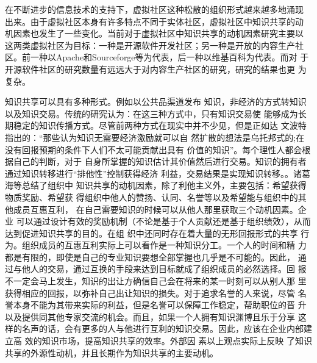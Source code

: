 \documentclass[12pt,a4paper]{ctexart}
\begin{document}
在不断进步的信息技术的支持下，虚拟社区这种松散的组织形式越来越多地涌现
出来。由于虚拟社区本身有许多特点不同于实体社区，虚拟社区中知识共享的动
机因素也发生了一些变化。当前对于虚拟社区中知识共享的动机因素研究主要以
这两类虚拟社区为目标：一种是开源软件开发社区；另一种是开放的内容生产社
区。前一种以Apache和Sourceforge等为代表，后一种以维基百科为代表。而对
于开源软件社区的研究数量有远远大于对内容生产社区的研究，研究的结果也更
为复杂。

知识共享可以具有多种形式。例如以公共品渠道发布
知识，非经济的方式转知识以及知识交易。传统的研究认为：在这三种方式中，只有知识交易使
能够成为长期稳定的知识传播方式。尽管前两种方式在现实中并不少见，但是正如达
文波特指出的：“那些认为知识无需要经济激励就可以自
然扩散的想法是乌托邦式的;在没有回报预期的条件下人们不太可能贡献出具有
价值的知识”\cite{davenport1998wko}。每个理性人都会根据自己的判断，对于
自身所掌握的知识估计其价值然后进行交易。知识的拥有者通过知识转移进行“排他性”控制获得经济
利益，交易结果是实现知识转移。\cite{zhoubo2006}。诸葛海等总结了组织中
知识共享的动机因素，除了利他主义外，主要包括：希望获得物质奖励、希望获
得组织中他人的赞扬、认同、名誉等以及希望能与组织中的其他成员互惠互利，
在自己需要知识的时候可以从他人那里获取三个动机因素\cite{Zhugea}。企业
可以通过设计有效的奖励机制（不论是基于个人贡献还是基于组织绩效），从而
达到促进知识共享的目的\cite{Lee2007}。在组
织中还同时存在着大量的无形回报形式的共享
行为。组织成员的互惠互利实际上可以看作是一种知识分工。一个人的时间和精
力都是有限的，即使是自己的专业知识要想全部掌握也几乎是不可能的。因此，
通过与他人的交易，通过互换的手段来达到目标就成了组织成员的必然选择。回
报不一定会马上发生，知识的出让方确信自己会在将来的某一时刻可以从别人那
里获得相应的回报，以弥补自己出让知识的损失。对于追求名誉的人来说，尽管
名誉本身不能为其带来实际的利益，但是名誉可以保障工作稳定，帮助职位的晋
升以及提供同其他专家交流的机会。而且，如果一个人拥有知识渊博且乐于分享
这样的名声的话，会有更多的人与他进行互利的知识交易。因此，应该在企业内部建立高
效的知识市场，提高知识共享的效率\cite{Andreas2007}。外部因
素以上观点实际上反映
了知识共享的外源性动机，并且长期作为知识共享的主要动机。
\end{document}
